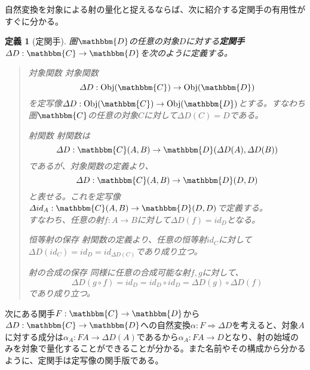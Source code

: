 \documentclass[uplatex,dvipdfmx]{jsarticle}
\newcommand{\cat}[1]{\mathbbm{#1}}
\newcommand{\arrow}{\rightarrow}
\newcommand{\functor}[3]{#1:\cat{#2}\arrow \cat{#3}}
\newcommand{\nat}[3]{#1:#2\Rightarrow #3}
\newcommand{\obj}[1]{\mathrm{Obj}(\cat{#1})}
\newcommand{\mor}[3]{#1:#2\arrow #3}
\newcommand{\arset}[3]{\cat{#1}(#2,#3)}
\newtheorem{define}[proof]{定義}
\numberwithin{proof}{subsection}
\newenvironment{mydescription}
{\begin{description}
  \setlength{\parskip}{0.5cm}
}
{\end{description}}
\begin{document}
  自然変換を対象による射の量化と捉えるならば、次に紹介する定関手の有用性がすぐに分かる。
  \begin{define}[定関手]
    圏$\cat{D}$の任意の対象$D$に対する\textbf{定関手}$\functor{\varDelta D}{C}{D}$を次のように定義する。
    \begin{quote}
			\begin{mydescription}
				\item[対象関数] 対象関数\[\mor{\varDelta D}{\obj{C}}{\obj{D}}\]
				を定写像$\mor{\varDelta D}{\obj{C}}{\obj{D}}$とする。すなわち圏$\cat{C}$の任意の対象$C$に対して$\varDelta D(C)=D$である。
				\item[射関数] 
        射関数は\[\mor{\varDelta D}{\arset{C}{A}{B}}{\arset{D}{\varDelta D(A)}{\varDelta D(B)}}\]であるが、対象関数の定義より、\[\mor{\varDelta D}{\arset{C}{A}{B}}{\arset{D}{D}{D}}\]と表せる。これを定写像$\mor{\varDelta id_A}{\arset{C}{A}{B}}{\arset{D}{D}{D}}$で定義する。\\
        すなわち、任意の射$\mor{f}{A}{B}$に対して$\varDelta D (f)=id_D$となる。
				\item[恒等射の保存] 射関数の定義より、任意の恒等射$id_C$に対して$\varDelta D (id_C)=id_D=id_{\varDelta D(C)}$であり成り立つ。
				\item[射の合成の保存] 同様に任意の合成可能な射$f,g$に対して、\[\varDelta D (g\circ f)=id_D=id_D\circ id_D=\varDelta D (g)\circ \varDelta D (f)\]であり成り立つ。
			\end{mydescription}
		\end{quote}
    \begin{center}
    \end{center}
  \end{define}
  次にある関手$\functor{F}{C}{D}$から$\functor{\varDelta D}{C}{D}$への自然変換$\nat{\alpha}{F}{\varDelta D}$を考えると、対象$A$に対する成分は$\mor{\alpha_A}{FA}{\varDelta D(A)}$であるから$\mor{\alpha_A}{FA}{D}$となり、射の始域のみを対象で量化することができることが分かる。また名前やその構成から分かるように、定関手は定写像の関手版である。
\end{document}

